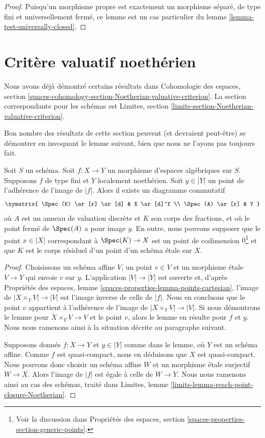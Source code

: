 \begin{proof}
Puisqu'un morphisme propre est exactement un morphisme
séparé, de type fini et universellement fermé, ce
lemme est un cas particulier du lemme \ref{lemma-test-universally-closed}.
\end{proof}


\section{Critère valuatif noethérien}
\label{section-Noetherian-valuative-criterion}

\noindent
Nous avons déjà démontré certains résultats dans Cohomologie des espaces, section
\ref{spaces-cohomology-section-Noetherian-valuative-criterion}.
La section correspondante pour les schémas est
Limites, section \ref{limits-section-Noetherian-valuative-criterion}.

\medskip\noindent
Bon nombre des résultats de cette section peuvent (et devraient peut-être)
se démontrer en invoquant le lemme suivant, bien que nous ne l'ayons pas
toujours fait.

\begin{lemma}
\label{lemma-reach-point-closure-Noetherian}
Soit $S$ un schéma. Soit $f : X \to Y$ un morphisme d'espaces algébriques
sur $S$. Supposons $f$ de type fini et $Y$ localement noethérien.
Soit $y \in |Y|$ un point de l'adhérence de l'image de $|f|$.
Alors il existe un diagramme commutatif
$$
\xymatrix{
\Spec(K) \ar[r] \ar[d] & X \ar[d]^f \\
\Spec(A) \ar[r] & Y
}
$$
où $A$ est un anneau de valuation discrète et $K$ son corps des fractions,
et où le point fermé de $\Spec(A)$ a pour image $y$. En outre, nous pouvons supposer
que le point $x \in |X|$ correspondant à $\Spec(K) \to X$ est un point de
codimension $0$\footnote{Voir la discussion dans
Propriétés des espaces, section \ref{spaces-properties-section-generic-points}.}
et que $K$ est le corps résiduel d'un point
d'un schéma \'etale sur $X$.
\end{lemma}

\begin{proof}
Choisissons un schéma affine $V$, un point $v \in V$ et un morphisme \'etale
$V \to Y$ qui envoie $v$ sur $y$. L'application $|V| \to |Y|$ est ouverte et, d'après
Propriétés des espaces, lemme \ref{spaces-properties-lemma-points-cartesian},
l'image de $|X \times_Y V| \to |V|$ est l'image inverse de
celle de $|f|$. Nous en concluons que le point $v$ appartient à l'adhérence de
l'image de $|X \times_Y V| \to |V|$. Si nous démontrons le lemme pour
$X \times_Y V \to V$ et le point $v$, alors le lemme en résulte pour
$f$ et $y$. Nous nous ramenons ainsi à la situation décrite au
paragraphe suivant.

\medskip\noindent
Supposons donnés $f : X \to Y$ et $y \in |Y|$ comme dans le lemme, où
$Y$ est un schéma affine. Comme $f$ est quasi-compact, nous en déduisons que
$X$ est quasi-compact. Nous pouvons donc choisir un schéma affine $W$ et
un morphisme \'etale surjectif $W \to X$. Alors l'image de
$|f|$ est égale à celle de $W \to Y$. Nous nous ramenons ainsi
au cas des schémas, traité dans
Limites, lemme \ref{limits-lemma-reach-point-closure-Noetherian}.
\end{proof}

